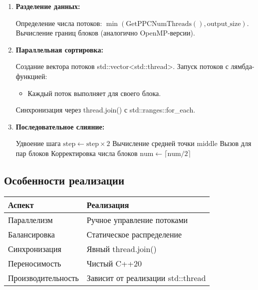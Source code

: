 \documentclass[a4paper,14pt]{extarticle}
\begin{document}
\begin{enumerate}[leftmargin=*]
    \item \textbf{Разделение данных:}
    \begin{algorithmic}[1]
        \State Определение числа потоков: $\min(\text{GetPPCNumThreads}(), \text{output\_size})$.
        \State Вычисление границ блоков (аналогично OpenMP-версии).
    \end{algorithmic}

    \item \textbf{Параллельная сортировка:}
    \begin{algorithmic}[1]
        \State Создание вектора потоков std::vector<std::thread>.
        \State Запуск потоков с лямбда-функцией:
        \begin{itemize}[leftmargin=*]
            \item Каждый поток выполняет  для своего блока.
        \end{itemize}
        \State Синхронизация через thread.join() с std::ranges::for\_each.
    \end{algorithmic}

    \item \textbf{Последовательное слияние:}
    \begin{algorithmic}[1]
            \State Удвоение шага $\text{step} \gets \text{step} \times 2$
                \State Вычисление средней точки $\text{middle}$
                \State Вызов  для пар блоков
            \EndFor
            \State Корректировка числа блоков $\text{num} \gets \lceil\text{num}/2\rceil$
        \EndWhile
    \end{algorithmic}
\end{enumerate}

\subsection*{Особенности реализации}

\begin{tabular}{|l|l|}
    \hline
    \textbf{Аспект} & \textbf{Реализация} \\ \hline
    Параллелизм & Ручное управление потоками \\ \hline
    Балансировка & Статическое распределение \\ \hline
    Синхронизация & Явный thread.join() \\ \hline
    Переносимость & Чистый C++20 \\ \hline
    Производительность & Зависит от реализации std::thread \\ \hline
\end{tabular}
\end{document}
